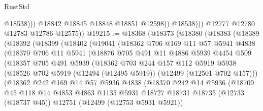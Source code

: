 \begin{lexlean}{RustStd}
\begin{coremodule}
{\begin{coremodule}
{{{{{{{{{{{{{{{{{{{{{{{{{{{{{{{{{{{{{{{{{{{{{{{{{{{{{{{{{{{{{{{{{{{{{{{{{{{{{{{{                        @18538)))
                  @18842
                  @18845
                  @18848
                  @18851
                  @12598))
              @18538)))
        @12777
        @12780
        @12783
        @12786
        @12575))
@19215 := @18368
    (@18373
      (@18380
        (@18383
          (@18389
            (@18392
              (@18399
                (@18402
                  (@19041
                    (@18362
                      @706
                      @169
                      @11
                      @57
                      @5941
                      @4838
                      (@18370
                        @706
                        @11
                        @5941
                        (@18876
                          @705
                          @491
                          @11
                          @4886
                          @5939
                          @4454
                          @509
                          (@18357
                            @705
                            @491
                            @5939
                            (@18362
                              @703
                              @244
                              @157
                              @112
                              @5919
                              @5938
                              (@18526
                                @702
                                @5919
                                (@12494 (@12495 @5919))
                                (@12499 (@12501 @702 @157)))
                              (@18362
                                @242
                                @169
                                @14
                                @57
                                @5936
                                @4838
                                (@18370
                                  @242
                                  @14
                                  @5936
                                  (@18709
                                    @45
                                    @118
                                    @14
                                    @4853
                                    @4863
                                    @1135
                                    @5931
                                    @18727
                                    @18731
                                    @18735
                                    (@12733 (@18737 @45))
                                    @12751
                                    (@12499 (@12753 @5931 @5921))
}}}}}}}}}}}}}}}}}}}}}}}}}}}}}}}}}}}}}}}}}}}}}}}}}}}}}}}}}}}}}}}}}}}}}}}}}}}}}}}}
\end{coremodule}}
\end{coremodule}
\end{lexlean}
